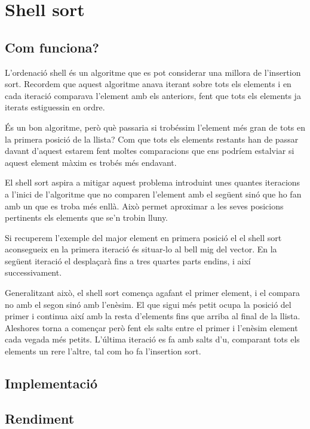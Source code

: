 \chapter{Shell sort}

\section{Com funciona?}
L'ordenació shell és un algoritme que es pot considerar una millora de l'insertion sort.
Recordem que aquest algoritme anava iterant sobre tots els elements i en cada iteració comparava l'element amb els anteriors, fent que tots els elements ja iterats estiguessin en ordre.

És un bon algoritme, però què passaria si trobéssim l'element més gran de tots en la primera posició de la llista?
Com que tots els elements restants han de passar davant d'aquest estarem fent moltes comparacions que ens podríem estalviar si aquest element màxim es trobés més endavant.

El shell sort aspira a mitigar aquest problema introduint unes quantes iteracions a l'inici de l'algoritme que no comparen l'element amb el següent sinó que ho fan amb un que es troba més enllà.
Això permet aproximar a les seves posicions pertinents els elements que se'n trobin lluny.

Si recuperem l'exemple del major element en primera posició el el shell sort aconsegueix en la primera iteració és situar-lo al bell mig del vector.
En la següent iteració el desplaçarà fins a tres quartes parts endins, i així successivament.

Generalitzant això, el shell sort comença agafant el primer element, i el compara no amb el segon sinó amb l'enèsim. El que sigui més petit ocupa la posició del primer i continua així amb la resta d'elements fins que arriba al final de la llista. Aleshores torna a començar però fent els salts entre el primer i l'enèsim element cada vegada més petits.
L'última iteració es fa amb salts d'u, comparant tots els elements un rere l'altre, tal com ho fa l'insertion sort.

\section{Implementació}


\begin{minipage}{\textwidth}
	\section{Rendiment}
	\noindent
	\makebox[\textwidth][c]{
		
	}
	\vspace*{1em}
	\begin{center}
		\resizebox{\textwidth}{!}{}
	\end{center}
\end{minipage}